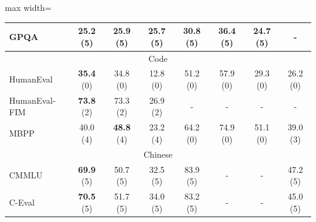 \documentclass{article}
\begin{document}
\begin{table}[t!]
\begin{adjustbox}{max width=\textwidth}
\begin{tabular}{l|ccc|cccc}
        GPQA & 25.2 (5) & \textbf{25.9} (5) & 25.7 (5) & 30.8 (5) & 36.4 (5) & 24.7 (5) & - \\
      \midrule
        \multicolumn{8}{c}{Code} \\
      \midrule
        HumanEval & \textbf{35.4} (0) & 34.8 (0) & 12.8 (0) & 51.2 (0) & 57.9 (0) & 29.3 (0) & 26.2 (0) \\    
        HumanEval-FIM & \textbf{73.8} (2) & 73.3 (2) & 26.9 (2) & - & - & - & - \\
        MBPP & 40.0 (4) & \textbf{48.8} (4) & 23.2 (4) & 64.2 (0) & 74.9 (0) & 51.1 (0) & 39.0 (3) \\
      \midrule
        \multicolumn{8}{c}{Chinese}\\
      \midrule
        CMMLU & \textbf{69.9} (5) & 50.7 (5) & 32.5 (5) & 83.9 (5) & - & - & 47.2 (5) \\
        C-Eval & \textbf{70.5} (5) & 51.7 (5) & 34.0 (5) & 83.2 (5) & - & - & 45.0 (5) \\ 
      \bottomrule
    \end{tabular}
    \end{adjustbox}
\end{table}
\end{document}
